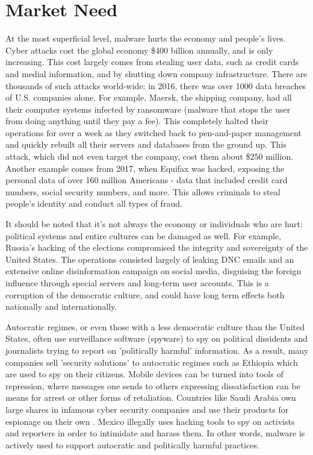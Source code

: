 \documentclass[openright]{report}
\begin{document}
\section{Market Need}

\par At the most superficial level, malware hurts the economy and people's lives. Cyber attacks cost the global economy \$400 billion annually, and is only increasing. This cost largely comes from stealing user data, such as credit cards and medial information, and by shutting down company infrastructure. There are thousands of such attacks world-wide: in 2016, there was over 1000 data breaches of U.S. companies alone. For example, Maersk, the shipping company, had all their computer systems infected by ransomware (malware that stops the user from doing anything until they pay a fee). This completely halted their operations for over a week as they switched back to pen-and-paper management and quickly rebuilt all their servers and databases from the ground up. This attack, which did not even target the company, cost them about \$250 million\cite{maersk}. Another example comes from 2017, when Equifax was hacked, exposing the personal data of over 160 million Americans - data that included credit card numbers, social security numbers, and more. This allows criminals to steal people's identity and conduct all types of fraud.

\par It should be noted that it's not always the economy or individuals who are hurt: political systems and entire cultures can be damaged as well. For example, Russia's hacking of the elections compromised the integrity and sovereignty of the United States\cite{russa_indicement}. The operations consisted largely of leaking DNC emails and an extensive online disinformation campaign on social media, disguising the foreign influence through special servers and long-term user accounts\cite{russa_indicement_nyt}\cite{what_russia_did}. This is a corruption of the democratic culture, and could have long term effects both nationally and internationally. 

\par Autocratic regimes, or even those with a less democratic culture than the United States, often use surveillance software (spyware) to spy on political dissidents and journalists trying to report on 'politically harmful' information. As a result, many companies sell 'security solutions' to autocratic regimes such as Ethiopia which are used to spy on their citizens\cite{ethiopia_surveillance}. Mobile devices can be turned into tools of repression, where messages one sends to others expressing dissatisfaction can be means for arrest or other forms of retaliation. Countries like Saudi Arabia own large shares in infamous cyber security companies and use their products for espionage on their own \cite{saudi_cyber}. Mexico illegally uses hacking tools to spy on activists and reporters in order to intimidate and harass them\cite{mexico_cyber}. In other words, malware is actively used to support autocratic and politically harmful practices.
\end{document}
